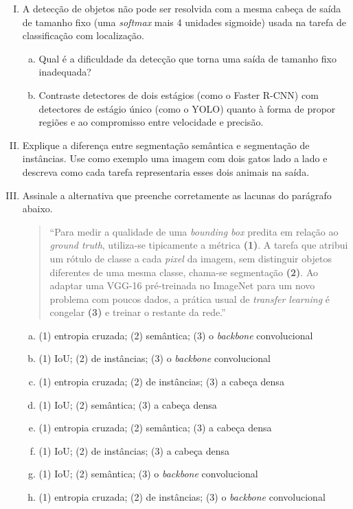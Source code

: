 \documentclass{dlproblemset}
\begin{document}
\begin{enumerate}[I)]
\item A detecção de objetos não pode ser resolvida com a mesma cabeça de saída de tamanho fixo (uma \textit{softmax} mais 4 unidades sigmoide) usada na tarefa de classificação com localização.
\begin{enumerate}[a)]
    \item Qual é a dificuldade da detecção que torna uma saída de tamanho fixo inadequada?
    \item Contraste detectores de dois estágios (como o Faster R-CNN) com detectores de estágio único (como o YOLO) quanto à forma de propor regiões e ao compromisso entre velocidade e precisão.
\end{enumerate}

\item Explique a diferença entre segmentação semântica e segmentação de instâncias. Use como exemplo uma imagem com dois gatos lado a lado e descreva como cada tarefa representaria esses dois animais na saída.

\item Assinale a alternativa que preenche corretamente as lacunas do parágrafo abaixo.

\begin{quote}
``Para medir a qualidade de uma \textit{bounding box} predita em relação ao \textit{ground truth}, utiliza-se tipicamente a métrica \textbf{(1)}. A tarefa que atribui um rótulo de classe a cada \textit{pixel} da imagem, sem distinguir objetos diferentes de uma mesma classe, chama-se segmentação \textbf{(2)}. Ao adaptar uma VGG-16 pré-treinada no ImageNet para um novo problema com poucos dados, a prática usual de \textit{transfer learning} é congelar \textbf{(3)} e treinar o restante da rede.''
\end{quote}

\begin{enumerate}[a)]
    \item (1) entropia cruzada; (2) semântica; (3) o \textit{backbone} convolucional
    \item (1) IoU; (2) de instâncias; (3) o \textit{backbone} convolucional
    \item (1) entropia cruzada; (2) de instâncias; (3) a cabeça densa
    \item (1) IoU; (2) semântica; (3) a cabeça densa
    \item (1) entropia cruzada; (2) semântica; (3) a cabeça densa
    \item (1) IoU; (2) de instâncias; (3) a cabeça densa
    \item (1) IoU; (2) semântica; (3) o \textit{backbone} convolucional
    \item (1) entropia cruzada; (2) de instâncias; (3) o \textit{backbone} convolucional
\end{enumerate}

\end{enumerate}
\end{document}
